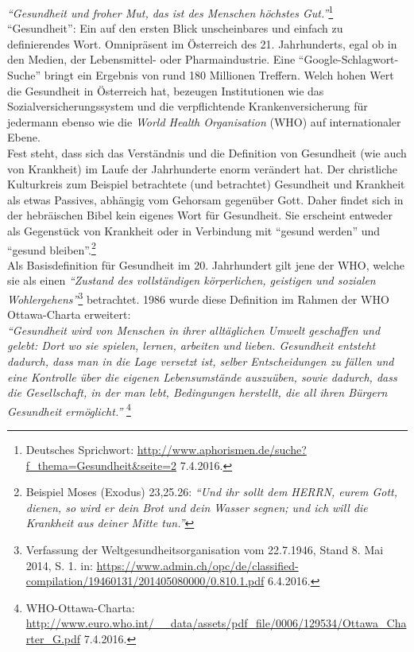 \documentclass[
    a4paper,
    12pt,
    hyphens,
    chapterprefix=true,
    headheight=33pt,
    footheight=29pt,
    headings=optiontohead, %
]{scrartcl}
\begin{document}
\textit{"`Gesundheit und froher Mut, das ist des Menschen höchstes Gut."'}\footnote{Deutsches Sprichwort: \url{http://www.aphorismen.de/suche?f_thema=Gesundheit&seite=2} 7.4.2016.}\\ "`Gesundheit"': Ein auf den ersten Blick unscheinbares und einfach zu definierendes Wort.
Omnipräsent im Österreich des 21. Jahrhunderts, egal ob in den Medien, der Lebensmittel- oder Pharmaindustrie. Eine "`Google-Schlagwort-Suche"' bringt ein Ergebnis von rund 180 Millionen Treffern. Welch hohen Wert die Gesundheit in Österreich hat, bezeugen Institutionen wie das Sozialversicherungssystem und die verpflichtende
Krankenversicherung für jedermann ebenso wie die \textit{World Health Organisation} (WHO) auf internationaler Ebene.\\
Fest steht, dass sich das Verständnis und die Definition von Gesundheit (wie auch von Krankheit) im Laufe der Jahrhunderte enorm verändert hat. Der christliche Kulturkreis zum Beispiel betrachtete (und betrachtet) Gesundheit und Krankheit als etwas Passives, abhängig vom Gehorsam gegenüber Gott. Daher findet sich in der hebräischen Bibel kein eigenes Wort für Gesundheit. Sie erscheint entweder als Gegenstück von Krankheit oder in Verbindung mit "`gesund werden"' und "`gesund bleiben"'.\footnote{Beispiel Moses (Exodus) 23,25.26: \textit{"`Und ihr sollt dem HERRN, eurem Gott, dienen, so wird er dein Brot und dein Wasser segnen; und ich will die Krankheit aus deiner Mitte tun."'}} \\
Als Basisdefinition für Gesundheit im 20. Jahrhundert gilt jene der WHO, welche sie als einen \textit{"`Zustand des vollständigen körperlichen, geistigen und sozialen Wohlergehens"'}\footnote{Verfassung der Weltgesundheitsorganisation vom 22.7.1946, Stand 8. Mai 2014, 
S. 1. in: \url{https://www.admin.ch/opc/de/classified-compilation/19460131/201405080000/0.810.1.pdf} 6.4.2016.} betrachtet. 1986 wurde diese Definition im Rahmen der WHO Ottawa-Charta erweitert:\\
\textit{"`Gesundheit wird von Menschen in ihrer alltäglichen Umwelt geschaffen und gelebt: Dort wo sie spielen, lernen, arbeiten und lieben. Gesundheit entsteht dadurch, dass man in die Lage versetzt ist, selber Entscheidungen zu fällen und eine Kontrolle über die eigenen Lebensumstände auszuüben, sowie dadurch, dass die Gesellschaft, in 
der man lebt, Bedingungen herstellt, die all ihren Bürgern Gesundheit ermöglicht."'}
\footnote{WHO-Ottawa-Charta: \url{http://www.euro.who.int/__data/assets/pdf_file/0006/129534/Ottawa_Charter_G.pdf} 7.4.2016.}\\
\end{document}
